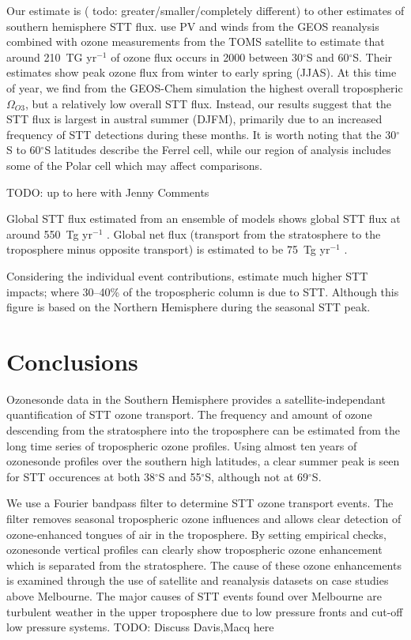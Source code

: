 \documentclass{article}
\begin{document}
  Our estimate is ( todo: greater/smaller/completely different) to other estimates of southern hemisphere STT flux. 
  \citet{Olsen2003} use PV and winds from the GEOS reanalysis combined with ozone measurements from the TOMS satellite to estimate that around 210~TG yr$^{-1}$ of ozone flux occurs in 2000 between 30$^{\circ}$S and 60$^{\circ}$S.
  Their estimates show peak ozone flux from winter to early spring (JJAS). 
  At this time of year, we find from the GEOS-Chem simulation the highest overall tropospheric $\Omega_{O3}$, but a relatively low overall STT flux.
  Instead, our results suggest that the STT flux is largest in austral summer (DJFM), primarily due to an increased frequency of STT detections during these months.
  It is worth noting that the 30$^{\circ}$S to 60$^{\circ}$S latitudes describe the Ferrel cell, while our region of analysis includes some of the Polar cell which may affect comparisons.
  
  TODO: up to here with Jenny Comments
  
  Global STT flux estimated from an ensemble of models shows global STT flux at around 550~Tg yr$^{-1}$ \citep{Stevenson2006}.
  Global net flux (transport from the stratosphere to the troposphere minus opposite transport) is estimated to be 75~Tg yr$^{-1}$ \citep{Sprenger2003}.
  
  Considering the individual event contributions, \citet{Terao2008} estimate much higher STT impacts; where 30--40\% of the tropospheric column is due to STT. 
  Although this figure is based on the Northern Hemisphere during the seasonal STT peak.
  
  
\section{Conclusions}
  
  Ozonesonde data in the Southern Hemisphere provides a satellite-independant quantification of STT ozone transport.
  The frequency and amount of ozone descending from the stratosphere into the troposphere can be estimated from the long time series of tropospheric ozone profiles.
  Using almost ten years of ozonesonde profiles over the southern high latitudes, a clear summer peak is seen for STT occurences at both 38$^{\circ}$S and 55$^{\circ}$S, although not at 69$^{\circ}$S.
  
  We use a Fourier bandpass filter to determine STT ozone transport events.
  The filter removes seasonal tropospheric ozone influences and allows clear detection of ozone-enhanced tongues of air in the troposphere.
  By setting empirical checks, ozonesonde vertical profiles can clearly show tropospheric ozone enhancement which is separated from the stratosphere.
  The cause of these ozone enhancements is examined through the use of satellite and reanalysis datasets on case studies above Melbourne.
  The major causes of STT events found over Melbourne are turbulent weather in the upper troposphere due to low pressure fronts and cut-off low pressure systems.
  TODO: Discuss Davis,Macq here
  
\end{document}
